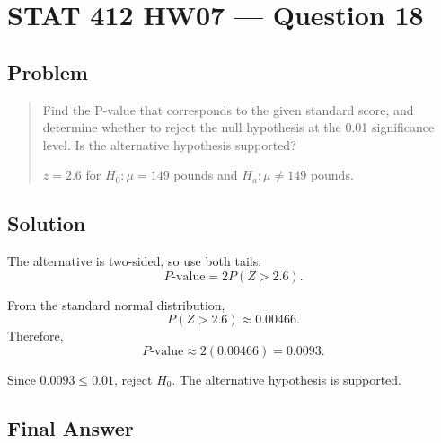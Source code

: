 \documentclass[11pt]{article}
\begin{document}
\section*{STAT 412 HW07 --- Question 18}

\subsection*{Problem}

\begin{quote}
Find the P-value that corresponds to the given standard score, and determine whether to reject the null hypothesis at the 0.01 significance level. Is the alternative hypothesis supported?

$z=2.6$ for $H_0:\mu=149$ pounds and $H_a:\mu\ne149$ pounds.
\end{quote}

\subsection*{Solution}

The alternative is two-sided, so use both tails:
\[
P\text{-value}=2P(Z>2.6).
\]

From the standard normal distribution,
\[
P(Z>2.6)\approx 0.00466.
\]
Therefore,
\[
P\text{-value}\approx 2(0.00466)=0.0093.
\]

Since $0.0093\le0.01$, reject $H_0$. The alternative hypothesis is supported.

\subsection*{Final Answer}

\end{document}
